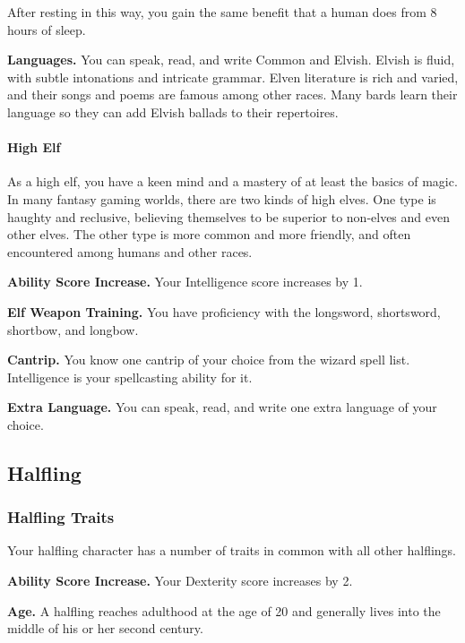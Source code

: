 After resting in this way, you gain the same benefit that a human does
from 8 hours of sleep.

\textbf{Languages.} You can speak, read, and write Common and Elvish.
Elvish is fluid, with subtle intonations and intricate grammar. Elven
literature is rich and varied, and their songs and poems are famous
among other races. Many bards learn their language so they can add
Elvish ballads to their repertoires.

\hypertarget{high-elf}{%
\paragraph{High Elf}\label{high-elf}}

As a high elf, you have a keen mind and a mastery of at least the basics
of magic. In many fantasy gaming worlds, there are two kinds of high
elves. One type is haughty and reclusive, believing themselves to be
superior to non-elves and even other elves. The other type is more
common and more friendly, and often encountered among humans and other
races.

\textbf{Ability Score Increase.} Your Intelligence score increases by 1.

\textbf{Elf Weapon Training.} You have proficiency with the longsword,
shortsword, shortbow, and longbow.

\textbf{Cantrip.} You know one cantrip of your choice from the wizard
spell list. Intelligence is your spellcasting ability for it.

\textbf{Extra Language.} You can speak, read, and write one extra
language of your choice.

\hypertarget{halfling}{%
\subsection{Halfling}\label{halfling}}

\hypertarget{halfling-traits}{%
\subsubsection{Halfling Traits}\label{halfling-traits}}

Your halfling character has a number of traits in common with all other
halflings.

\textbf{Ability Score Increase.} Your Dexterity score increases by 2.

\textbf{Age.} A halfling reaches adulthood at the age of 20 and
generally lives into the middle of his or her second century.


